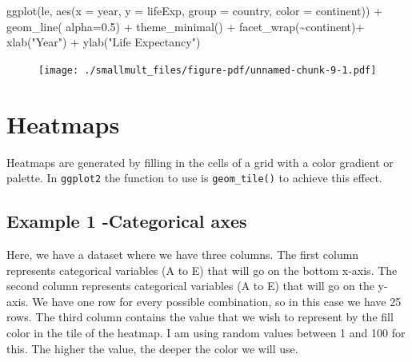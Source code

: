 \documentclass[
  letterpaper,
  DIV=11,
  numbers=noendperiod]{scrreprt}
\newenvironment{Shaded}{\begin{snugshade}}{\end{snugshade}}
\newcommand{\AttributeTok}[1]{\textcolor[rgb]{0.40,0.45,0.13}{#1}}
\newcommand{\FloatTok}[1]{\textcolor[rgb]{0.68,0.00,0.00}{#1}}
\newcommand{\FunctionTok}[1]{\textcolor[rgb]{0.28,0.35,0.67}{#1}}
\newcommand{\NormalTok}[1]{\textcolor[rgb]{0.00,0.23,0.31}{#1}}
\newcommand{\SpecialCharTok}[1]{\textcolor[rgb]{0.37,0.37,0.37}{#1}}
\newcommand{\StringTok}[1]{\textcolor[rgb]{0.13,0.47,0.30}{#1}}
\begin{document}
\begin{Shaded}
\begin{Highlighting}[]
\FunctionTok{ggplot}\NormalTok{(le, }\FunctionTok{aes}\NormalTok{(}\AttributeTok{x =}\NormalTok{ year, }\AttributeTok{y =}\NormalTok{ lifeExp, }\AttributeTok{group =}\NormalTok{ country, }\AttributeTok{color =}\NormalTok{ continent)) }\SpecialCharTok{+} 
  \FunctionTok{geom\_line}\NormalTok{( }\AttributeTok{alpha=}\FloatTok{0.5}\NormalTok{) }\SpecialCharTok{+}
  \FunctionTok{theme\_minimal}\NormalTok{() }\SpecialCharTok{+}
  \FunctionTok{facet\_wrap}\NormalTok{(}\SpecialCharTok{\textasciitilde{}}\NormalTok{continent)}\SpecialCharTok{+}
  \FunctionTok{xlab}\NormalTok{(}\StringTok{"Year"}\NormalTok{) }\SpecialCharTok{+}
  \FunctionTok{ylab}\NormalTok{(}\StringTok{"Life Expectancy"}\NormalTok{)}
\end{Highlighting}
\end{Shaded}

\begin{figure}[H]

{\centering \texttt{[image: ./smallmult\_files/figure-pdf/unnamed-chunk-9-1.pdf]}

}

\end{figure}


\hypertarget{heatmaps}{%
\chapter{Heatmaps}\label{heatmaps}}

Heatmaps are generated by filling in the cells of a grid with a color
gradient or palette. In \texttt{ggplot2} the function to use is
\texttt{geom\_tile()} to achieve this effect.

\hypertarget{example-1--categorical-axes}{%
\section{\texorpdfstring{\textbf{Example 1 -Categorical
axes}}{Example 1 -Categorical axes}}\label{example-1--categorical-axes}}

Here, we have a dataset where we have three columns. The first column
represents categorical variables (A to E) that will go on the bottom
x-axis. The second column represents categorical variables (A to E) that
will go on the y-axis. We have one row for every possible combination,
so in this case we have 25 rows. The third column contains the value
that we wish to represent by the fill color in the tile of the heatmap.
I am using random values between 1 and 100 for this. The higher the
value, the deeper the color we will use.
\end{document}

